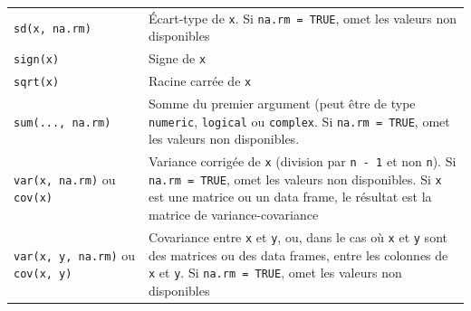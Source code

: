 \documentclass[
  11pt,
]{book}
\numberwithin{equation}{section}
\numberwithin{countremarque}{section}
\begin{document}
\begin{longtable}[]{@{}ll@{}}
\begin{minipage}[t]{0.41\columnwidth}
\texttt{sd(x,\ na.rm)}\strut
\end{minipage} & \begin{minipage}[t]{0.53\columnwidth}\raggedright
Écart-type de \texttt{x}. Si \texttt{na.rm\ =\ TRUE}, omet les valeurs non disponibles\strut
\end{minipage}\tabularnewline
\begin{minipage}[t]{0.41\columnwidth}\raggedright
\texttt{sign(x)}\strut
\end{minipage} & \begin{minipage}[t]{0.53\columnwidth}\raggedright
Signe de \texttt{x}\strut
\end{minipage}\tabularnewline
\begin{minipage}[t]{0.41\columnwidth}\raggedright
\texttt{sqrt(x)}\strut
\end{minipage} & \begin{minipage}[t]{0.53\columnwidth}\raggedright
Racine carrée de \texttt{x}\strut
\end{minipage}\tabularnewline
\begin{minipage}[t]{0.41\columnwidth}\raggedright
\texttt{sum(...,\ na.rm)}\strut
\end{minipage} & \begin{minipage}[t]{0.53\columnwidth}\raggedright
Somme du premier argument (peut être de type \texttt{numeric}, \texttt{logical} ou \texttt{complex}. Si \texttt{na.rm\ =\ TRUE}, omet les valeurs non disponibles.\strut
\end{minipage}\tabularnewline
\begin{minipage}[t]{0.41\columnwidth}\raggedright
\texttt{var(x,\ na.rm)} ou \texttt{cov(x)}\strut
\end{minipage} & \begin{minipage}[t]{0.53\columnwidth}\raggedright
Variance corrigée de \texttt{x} (division par \texttt{n\ -\ 1} et non \texttt{n}). Si \texttt{na.rm\ =\ TRUE}, omet les valeurs non disponibles. Si \texttt{x} est une matrice ou un data frame, le résultat est la matrice de variance-covariance\strut
\end{minipage}\tabularnewline
\begin{minipage}[t]{0.41\columnwidth}\raggedright
\texttt{var(x,\ y,\ na.rm)} ou \texttt{cov(x,\ y)}\strut
\end{minipage} & \begin{minipage}[t]{0.53\columnwidth}\raggedright
Covariance entre \texttt{x} et \texttt{y}, ou, dans le cas où \texttt{x} et \texttt{y} sont des matrices ou des data frames, entre les colonnes de \texttt{x} et \texttt{y}. Si \texttt{na.rm\ =\ TRUE}, omet les valeurs non disponibles\strut

\end{minipage}
\end{longtable}
\end{document}
